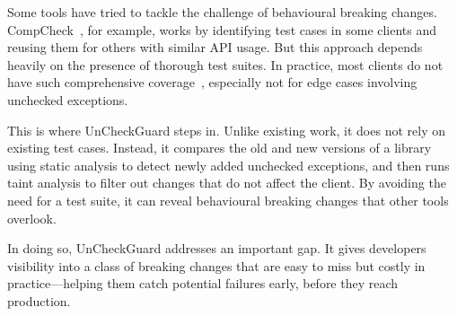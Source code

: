 Some tools have tried to tackle the challenge of behavioural breaking changes. CompCheck~\cite{CompCheck}, for example, works by identifying test cases in some clients and reusing them for others with similar API usage. But this approach depends heavily on the presence of thorough test suites. In practice, most clients do not have such comprehensive coverage~\cite{jayasuriya24:_under_apis}, especially not for edge cases involving unchecked exceptions.

This is where UnCheckGuard steps in. Unlike existing work, it does not rely on existing test cases. Instead, it compares the old and new versions of a library using static analysis to detect newly added unchecked exceptions, and then runs taint analysis to filter out changes that do not affect the client. By avoiding the need for a test suite, it can reveal behavioural breaking changes that other tools overlook.

In doing so, UnCheckGuard addresses an important gap. It gives developers visibility into a class of breaking changes that are easy to miss but costly in practice—helping them catch potential failures early, before they reach production.
